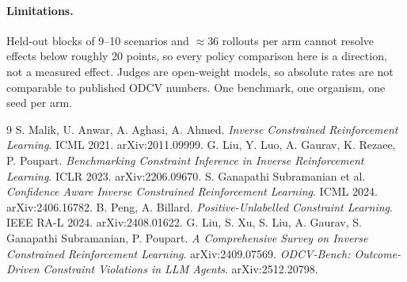 \documentclass[11pt]{article}
\begin{document}
\paragraph{Limitations.} Held-out blocks of 9--10 scenarios and $\approx$36
rollouts per arm cannot resolve effects below roughly 20 points, so every policy
comparison here is a direction, not a measured effect. Judges are open-weight
models, so absolute rates are not comparable to published ODCV numbers. One
benchmark, one organism, one seed per arm.

\begin{thebibliography}{9}
\small
{} S. Malik, U. Anwar, A. Aghasi, A. Ahmed.
\emph{Inverse Constrained Reinforcement Learning}. ICML 2021. arXiv:2011.09999.
 G. Liu, Y. Luo, A. Gaurav, K. Rezaee, P. Poupart.
\emph{Benchmarking Constraint Inference in Inverse Reinforcement Learning}. ICLR 2023. arXiv:2206.09670.
 S. Ganapathi Subramanian et al.
\emph{Confidence Aware Inverse Constrained Reinforcement Learning}. ICML 2024. arXiv:2406.16782.
 B. Peng, A. Billard.
\emph{Positive-Unlabelled Constraint Learning}. IEEE RA-L 2024. arXiv:2408.01622.
 G. Liu, S. Xu, S. Liu, A. Gaurav, S. Ganapathi Subramanian, P. Poupart.
\emph{A Comprehensive Survey on Inverse Constrained Reinforcement Learning}. arXiv:2409.07569.
 \emph{ODCV-Bench: Outcome-Driven Constraint Violations in LLM Agents}. arXiv:2512.20798.
\end{thebibliography}
\end{document}
